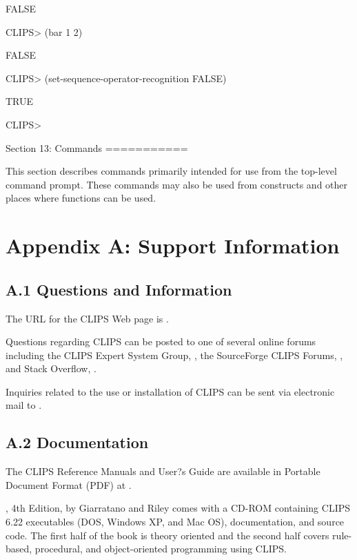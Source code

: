 \documentclass[letterpaper,10pt,english]{sphinxmanual}
\begin{document}
FALSE

CLIPS\textgreater{} (bar 1 2)

FALSE

CLIPS\textgreater{} (set-sequence-operator-recognition FALSE)

TRUE

CLIPS\textgreater{}

Section 13:
Commands
===========

This section describes commands primarily intended for use from the
top-level command prompt. These commands may also be used from
constructs and other places where functions can be used.


\chapter{Appendix A: Support Information}
\label{\detokenize{appendix:appendix-a-support-information}}\label{\detokenize{appendix::doc}}

\section{A.1 Questions and Information}
\label{\detokenize{appendix:a-1-questions-and-information}}
The URL for the CLIPS Web page is .

Questions regarding CLIPS can be posted to one of several online forums
including the CLIPS Expert System Group,
, the SourceForge CLIPS Forums,
, and Stack Overflow,
.

Inquiries related to the use or installation of CLIPS can be sent via
electronic mail to .


\section{A.2 Documentation}
\label{\detokenize{appendix:a-2-documentation}}
The CLIPS Reference Manuals and User?s Guide are available in Portable
Document Format (PDF) at
.

, 4th Edition, by Giarratano
and Riley comes with a CD-ROM containing CLIPS 6.22 executables (DOS,
Windows XP, and Mac OS), documentation, and source code. The first half
of the book is theory oriented and the second half covers rule-based,
procedural, and object-oriented programming using CLIPS.
\end{document}
